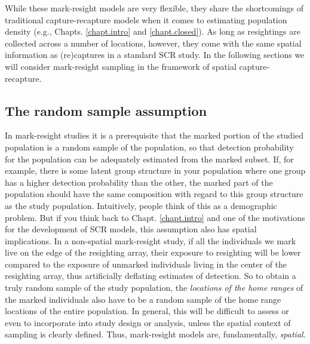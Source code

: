 While these mark-resight models are very flexible, they share the
shortcomings of traditional capture-recapture models when it comes to
estimating population density (e.g., Chapts. \ref{chapt.intro} and
\ref{chapt.closed}). As long as resightings are collected across a
number of locations, however, they come with the same spatial
information as (re)captures in a standard SCR study.  In the following
sections we will consider mark-resight sampling in the framework of
spatial capture-recapture.


\subsection {The random sample assumption}
\label{partialID.sec.random}

In mark-resight studies it is a prerequisite that the marked portion
of the studied population is a random sample of the population, so
that detection probability for the population can be adequately
estimated from the marked subset. If, for example, there is some
latent group structure in your population where one group has a higher
detection probability than the other, the marked part of the
population should have the same composition with regard to this group
structure as the study population. Intuitively, people think of this
as a demographic problem. But if you think back to
Chapt. \ref{chapt.intro} and one of the motivations for the
development of SCR models, this assumption also has spatial
implications. In a non-spatial mark-resight study, if all the
individuals we mark live on the edge of the resighting array, their
exposure to resighting will be lower compared to the exposure of
unmarked individuals living in the center of the resighting array,
thus artificially deflating estimates of detection. So to obtain a
truly random sample of the study population, the \emph{locations of
  the home ranges} of the marked individuals also have to be a random
sample of the home range locations of the entire population.  In
general, this will be difficult to assess or even to incorporate into
study design or analysis, unless the spatial context of sampling is
clearly defined.
Thus, mark-resight models are, fundamentally, {\it spatial}.

